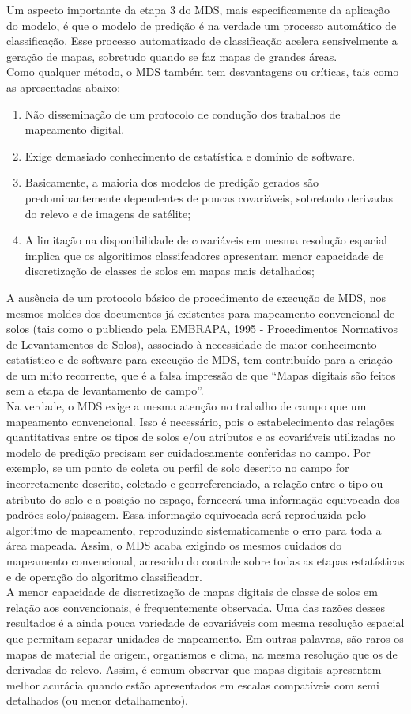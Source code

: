 Um aspecto importante da etapa 3 do MDS, mais especificamente da aplicação do modelo, é que o modelo de predição é na verdade um processo automático de classificação. Esse processo automatizado de classificação acelera sensivelmente a geração de mapas, sobretudo quando se faz mapas de grandes áreas.\\
Como qualquer método, o MDS também tem desvantagens ou críticas, tais como as apresentadas abaixo:
\begin{enumerate}
\item Não disseminação de um protocolo de condução dos trabalhos de mapeamento digital.
\item Exige demasiado conhecimento de estatística e domínio de software.
\item Basicamente, a maioria dos modelos de predição gerados são predominantemente dependentes de poucas covariáveis, sobretudo derivadas do relevo e de imagens de satélite;
\item A limitação na disponibilidade de covariáveis em mesma resolução espacial implica que os algoritimos classifcadores apresentam menor capacidade de discretização de classes de solos em mapas mais detalhados;
\end{enumerate}
A ausência de um protocolo básico de procedimento de execução de MDS, nos mesmos moldes dos documentos já existentes para mapeamento convencional de solos (tais como o publicado pela EMBRAPA, 1995 - Procedimentos Normativos de Levantamentos de Solos), associado à necessidade de maior conhecimento estatístico e de software para execução de MDS, tem contribuído para a criação de um mito recorrente, que é a falsa impressão de que ``Mapas digitais são feitos sem a etapa de levantamento
de campo''.\\
Na verdade, o MDS exige a mesma atenção no trabalho de campo que um mapeamento convencional. Isso é necessário, pois o estabelecimento das relações quantitativas entre os tipos de solos e/ou atributos e as covariáveis utilizadas no modelo de predição precisam ser cuidadosamente conferidas no campo. Por exemplo, se um ponto de coleta ou perfil de solo descrito no campo for incorretamente descrito, coletado e georreferenciado, a relação entre o tipo ou atributo do solo e a posição no espaço, fornecerá uma informação equivocada dos padrões solo/paisagem. Essa informação equivocada será reproduzida pelo algoritmo de mapeamento, reproduzindo sistematicamente o erro para toda a área mapeada. Assim, o MDS acaba exigindo os mesmos cuidados do mapeamento convencional, acrescido do controle sobre todas as etapas estatísticas e de operação do algoritmo classificador.\\
A menor capacidade de discretização de mapas digitais de classe de solos em relação aos convencionais, é frequentemente observada. Uma das razões desses resultados é a ainda pouca variedade de covariáveis com mesma resolução espacial que permitam separar unidades de mapeamento. Em outras palavras, são raros os mapas de material de origem, organismos e clima, na mesma resolução que os de derivadas do relevo. Assim, é comum observar que mapas digitais apresentem melhor acurácia quando estão apresentados em escalas compatíveis com semi detalhados (ou menor  detalhamento).
